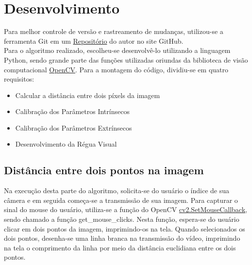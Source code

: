 \documentclass{bmvc2k}
\begin{document}
\section{Desenvolvimento}
Para melhor controle de versão e rastreamento de mudanças, utilizou-se a ferramenta Git em um \href{https://github.com/abdullah-zaiter/Camera-Calibration}{Repositório} do autor no site GitHub.\\
Para o algoritmo realizado, escolheu-se desenvolvê-lo utilizando a linguagem Python, sendo grande parte das funções utilizadas oriundas da biblioteca de visão computacional \href{https://opencv.org/}{OpenCV}\cite{opencvrefman}. Para a montagem do código, dividiu-se em quatro requisitos:
\begin{itemize}
    \item Calcular a distância entre dois píxels da imagem 
    \item Calibração dos Parâmetros Intrínsecos
    \item Calibração dos Parâmetros Extrínsecos
    \item Desenvolvimento da Régua Visual
\end{itemize}

\subsection{Distância entre dois pontos na imagem}
\label{subsubsec: Dist}
Na execução desta parte do algoritmo, solicita-se do usuário o índice de sua câmera e em seguida começa-se a transmissão de sua imagem. Para capturar o sinal do mouse do usuário, utiliza-se a função do OpenCV \href{https://docs.opencv.org/2.4/modules/highgui/doc/user_interface.html?highlight=setmousecallback#setmousecallback}{cv2.SetMouseCallback}, sendo chamado a função \small{get\_mouse\_clicks}. Nesta função, espera-se do usuário clicar em dois pontos da imagem, imprimindo-os na tela. Quando selecionados os dois pontos, desenha-se uma linha branca na transmissão do vídeo, imprimindo na tela o comprimento da linha por meio da distância euclidiana entre os dois pontos.  
\end{document}
